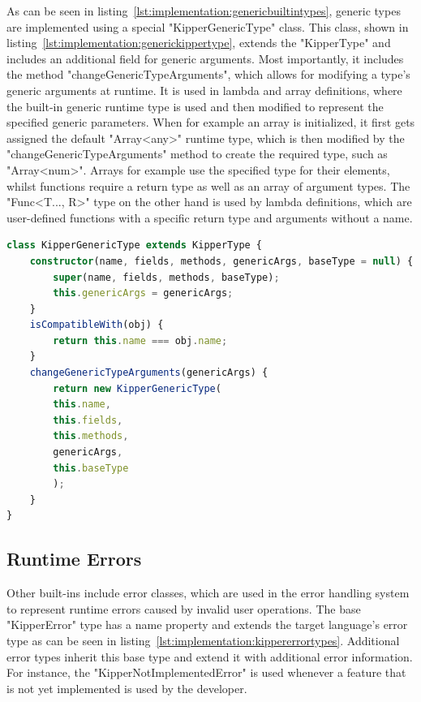As can be seen in listing~\ref{lst:implementation:genericbuiltintypes}, generic types are implemented using a special "KipperGenericType" class. This class, shown in listing~\ref{lst:implementation:generickippertype}, extends the "KipperType" and includes an additional field for generic arguments. Most importantly, it includes the method "changeGenericTypeArguments", which allows for modifying a type's generic arguments at runtime. It is used in lambda and array definitions, where the built-in generic runtime type is used and then modified to represent the specified generic parameters. When for example an array is initialized, it first gets assigned the default "Array<any>" runtime type, which is then modified by the "changeGenericTypeArguments" method to create the required type, such as "Array<num>". Arrays for example use the specified type for their elements, whilst functions require a return type as well as an array of argument types. The "Func<T..., R>" type on the other hand is used by lambda definitions, which are user-defined functions with a specific return type and arguments without a name.

\begin{lstlisting}[language=Typescript,caption=Generic Kipper Type,label=lst:implementation:generickippertype]
class KipperGenericType extends KipperType {
	constructor(name, fields, methods, genericArgs, baseType = null) {
		super(name, fields, methods, baseType);
		this.genericArgs = genericArgs;
	}
	isCompatibleWith(obj) {
		return this.name === obj.name;
	}
	changeGenericTypeArguments(genericArgs) {
		return new KipperGenericType(
		this.name,
		this.fields,
		this.methods,
		genericArgs,
		this.baseType
		);
	}
}
\end{lstlisting}

\subsection{Runtime Errors}

Other built-ins include error classes, which are used in the error handling system to represent runtime errors caused by invalid user operations. The base "KipperError" type has a name property and extends the target language's error type as can be seen in listing~\ref{lst:implementation:kippererrortypes}. Additional error types inherit this base type and extend it with additional error information. For instance, the "KipperNotImplementedError" is used whenever a feature that is not yet implemented is used by the developer.

